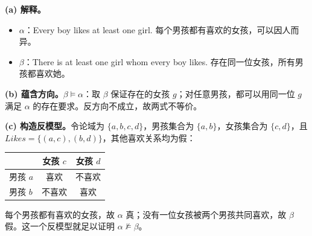 \begin{checkedsolution}
\textbf{(a) 解释。}
\begin{itemize}
  \item $\alpha$：Every boy likes at least one girl. 每个男孩都有喜欢的女孩，可以因人而异。
  \item $\beta$：There is at least one girl whom every boy likes. 存在同一位女孩，所有男孩都喜欢她。
\end{itemize}

\textbf{(b) 蕴含方向。}$\beta\models\alpha$：取 $\beta$ 保证存在的女孩 $g$；对任意男孩，都可以用同一位 $g$ 满足 $\alpha$ 的存在要求。反方向不成立，故两式不等价。

\textbf{(c) 构造反模型。}令论域为 $\{a,b,c,d\}$，男孩集合为 $\{a,b\}$，女孩集合为 $\{c,d\}$，且 $Likes=\{(a,c),(b,d)\}$，其他喜欢关系均为假：
\begin{center}
\begin{tabular}{@{}lcc@{}}
\toprule
 & 女孩 $c$ & 女孩 $d$ \\
\midrule
男孩 $a$ & 喜欢 & 不喜欢 \\
男孩 $b$ & 不喜欢 & 喜欢 \\
\bottomrule
\end{tabular}
\end{center}
每个男孩都有喜欢的女孩，故 $\alpha$ 真；没有一位女孩被两个男孩共同喜欢，故 $\beta$ 假。这一个反模型就足以证明 $\alpha\not\models\beta$。
\end{checkedsolution}
\endgroup
